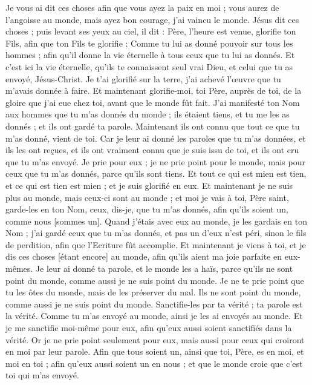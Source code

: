 \begin{multicols}{2}
Je vous ai dit ces choses afin que vous ayez la paix en moi ; vous aurez de l'angoisse au monde, mais ayez bon courage, j'ai vaincu le monde.
\VerseOne{}Jésus dit ces choses ; puis levant ses yeux au ciel, il dit : Père, l'heure est venue, glorifie ton Fils, afin que ton Fils te glorifie ;
Comme tu lui as donné pouvoir sur tous les hommes ; afin qu'il donne la vie éternelle à tous ceux que tu lui as donnés.
Et c'est ici la vie éternelle, qu'ils te connaissent seul vrai Dieu, et celui que tu as envoyé, Jésus-Christ.
Je t'ai glorifié sur la terre, j'ai achevé l'œuvre que tu m'avais donnée à faire.
Et maintenant glorifie-moi, toi Père, auprès de toi, de la gloire que j'ai eue chez toi, avant que le monde fût fait.
J'ai manifesté ton Nom aux hommes que tu m'as donnés du monde ; ils étaient tiens, et tu me les as donnés ; et ils ont gardé ta parole.
Maintenant ils ont connu que tout ce que tu m'as donné, vient de toi.
Car je leur ai donné les paroles que tu m'as données, et ils les ont reçues, et ils ont vraiment connu que je suis issu de toi, et ils ont cru que tu m'as envoyé.
Je prie pour eux ; je ne prie point pour le monde, mais pour ceux que tu m'as donnés, parce qu'ils sont tiens.
Et tout ce qui est mien est tien, et ce qui est tien est mien ; et je suis glorifié en eux.
Et maintenant je ne suis plus au monde, mais ceux-ci sont au monde ; et moi je vais à toi, Père saint, garde-les en ton Nom, ceux, dis-je, que tu m'as donnés, afin qu'ils soient un, comme nous [sommes un].
Quand j'étais avec eux au monde, je les gardais en ton Nom ; j'ai gardé ceux que tu m'as donnés, et pas un d'eux n'est péri, sinon le fils de perdition, afin que l'Ecriture fût accomplie.
Et maintenant je viens à toi, et je dis ces choses [étant encore] au monde, afin qu'ils aient ma joie parfaite en eux-mêmes.
Je leur ai donné ta parole, et le monde les a haïs, parce qu'ils ne sont point du monde, comme aussi je ne suis point du monde.
Je ne te prie point que tu les ôtes du monde, mais de les préserver du mal.
Ils ne sont point du monde, comme aussi je ne suis point du monde.
Sanctifie-les par ta vérité ; ta parole est la vérité.
Comme tu m'as envoyé au monde, ainsi je les ai envoyés au monde.
Et je me sanctifie moi-même pour eux, afin qu'eux aussi soient sanctifiés dans la vérité.
Or je ne prie point seulement pour eux, mais aussi pour ceux qui croiront en moi par leur parole.
Afin que tous soient un, ainsi que toi, Père, es en moi, et moi en toi ; afin qu'eux aussi soient un en nous ; et que le monde croie que c'est toi qui m'as envoyé.

\end{multicols}
